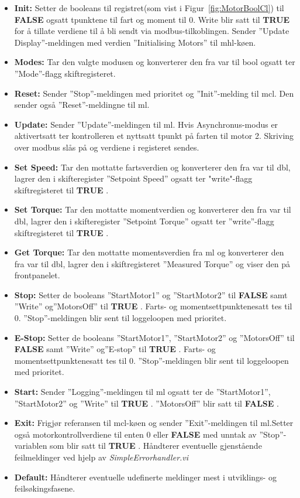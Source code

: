 \documentclass{ol-softwaremanual}
\newcommand{\figref}[1]{Figur~\ref{#1}}
\newcommand{\true}{\textbf{TRUE} }
\newcommand{\false}{\textbf{FALSE} }
\begin{document}
\begin{itemize}
    \item \textbf{Init:} Setter de \glspl{boolean} til registret(som vist i \figref{fig:MotorBoolCl}) til \false ogsatt tpunktene til fart og moment til $0$.  Write  blir satt til \true for å tillate verdiene til å bli sendt via \gls{modbus}-tilkoblingen. Sender ''Update Display''-meldingen med verdien ''Initialising Motors'' til \acrshort{mhl}-køen. 
    \item \textbf{Modes:} Tar den valgte modusen og konverterer den fra \gls{var} til \gls{bool}  ogsatt ter ''Mode''-flagg skiftregisteret.
    \item \textbf{Reset:} Sender ''Stop''-meldingen med prioritet og ''Init''-melding til \acrshort{mcl}. Den sender også ''Reset''-meldingne til \acrlong{ml}.
    \item \textbf{Update:} Sender ''Update''-meldingen til \acrshort{ml}. Hvis Asynchronus-modus er aktivertsatt ter kontrolleren et nyttsatt tpunkt på farten til motor 2. Skriving over modbus slås på og verdiene 
 i registeret sendes.
    \item \textbf{Set Speed:} Tar den mottatte fartsverdien og konverterer den fra  \gls{var} til \gls{dbl}, lagrer den i skifteregister ''Setpoint Speed'' ogsatt ter "write"-flagg skiftregisteret til \true. 
    \item \textbf{Set Torque:} Tar den mottatte momentverdien og konverterer den fra  \gls{var} til \gls{dbl}, lagrer den i skifteregister ''Setpoint Torque'' ogsatt ter ''write''-flagg skiftregisteret til \true. 
    \item \textbf{Get Torque:}  Tar den mottatte momentsverdien fra \acrshort{ml} og konverterer den fra \gls{var} til \gls{dbl}, lagrer den i skiftregisteret ''Measured Torque'' og viser den på frontpanelet.
    \item \textbf{Stop:} Setter de \glspl{boolean} ''StartMotor1'' og ''StartMotor2''  til \false samt ''Write'' og''MotorsOff'' til \true. Farts- og momentsettpunktenesatt tes til $0$. ''Stop''-meldingen blir sent til loggeloopen med prioritet.
      \item \textbf{E-Stop:} Setter de \glspl{boolean} ''StartMotor1'', ''StartMotor2'' og ''MotorsOff'' til \false samt ''Write'' og''E-stop'' til \true. Farts- og momentsettpunktenesatt tes til $0$. ''Stop''-meldingen blir sent til loggeloopen med prioritet.
    \item \textbf{Start:}  Sender ''Logging''-meldingen til \acrshort{ml} ogsatt ter de  ''StartMotor1'', ''StartMotor2'' og  ''Write'' til  \true. ''MotorsOff'' blir satt til \false. 
    \item \textbf{Exit:} Frigjør referansen til \acrshort{mcl}-køen og sender ''Exit''-meldingen til \acrshort{ml}.Setter også motorkontrollverdiene til enten $0$ eller \false med unntak av ''Stop''-variablen som blir satt til {\true}. Håndterer eventuelle gjenstående feilmeldinger ved hjelp av \textit{SimpleErrorhandler.vi}
    \item \textbf{Default:} Håndterer eventuelle udefinerte meldinger mest i utviklings- og feilsøkingsfasene.
\end{itemize}
\end{document}

